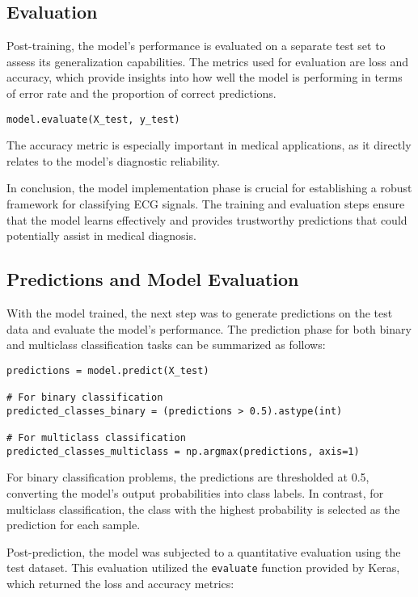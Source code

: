 \documentclass{report}
\begin{document}
\subsection{Evaluation}
Post-training, the model's performance is evaluated on a separate test set to assess its generalization capabilities. The metrics used for evaluation are loss and accuracy, which provide insights into how well the model is performing in terms of error rate and the proportion of correct predictions.

\begin{verbatim}
model.evaluate(X_test, y_test)
\end{verbatim}

The accuracy metric is especially important in medical applications, as it directly relates to the model's diagnostic reliability.

In conclusion, the model implementation phase is crucial for establishing a robust framework for classifying ECG signals. The training and evaluation steps ensure that the model learns effectively and provides trustworthy predictions that could potentially assist in medical diagnosis.


\subsection{Predictions and Model Evaluation}

With the model trained, the next step was to generate predictions on the test data and evaluate the model's performance. The prediction phase for both binary and multiclass classification tasks can be summarized as follows:

\begin{verbatim}
predictions = model.predict(X_test)

# For binary classification
predicted_classes_binary = (predictions > 0.5).astype(int)

# For multiclass classification
predicted_classes_multiclass = np.argmax(predictions, axis=1)
\end{verbatim}

For binary classification problems, the predictions are thresholded at 0.5, converting the model's output probabilities into class labels. In contrast, for multiclass classification, the class with the highest probability is selected as the prediction for each sample.

Post-prediction, the model was subjected to a quantitative evaluation using the test dataset. This evaluation utilized the \texttt{evaluate} function provided by Keras, which returned the loss and accuracy metrics:
\end{document}
